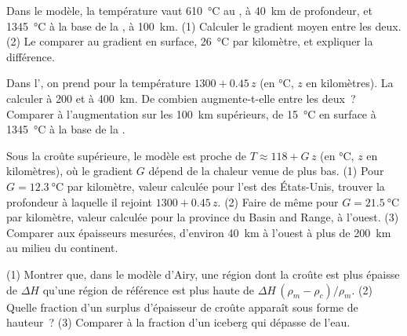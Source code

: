 \begin{exercise}[$\star\star$]\label{exo:g11:lithosphere-asthenosphere:10}
Dans le  modèle, la température vaut \qty{610}{\celsius} au , à
\qty{40}{km} de profondeur, et \qty{1345}{\celsius} à la base de la
, à \qty{100}{km}. (1) Calculer le gradient moyen entre les
deux. (2) Le comparer au gradient en surface, \qty{26}{\celsius} par
kilomètre, et expliquer la différence.
\end{exercise}

\begin{exercise}[$\star\star$]\label{exo:g11:lithosphere-asthenosphere:11}
Dans l', on prend pour la température $1300 + 0.45\,z$ (en
\unit{\celsius}, $z$ en kilomètres). La calculer à 200 et à \qty{400}{km}.
De combien augmente-t-elle entre les deux~? Comparer à l'augmentation sur les
\qty{100}{km} supérieurs, de \qty{15}{\celsius} en surface à
\qty{1345}{\celsius} à la base de la .
\end{exercise}

\begin{exercise}[$\star\star\star$]\label{exo:g11:lithosphere-asthenosphere:12}
Sous la croûte supérieure, le  modèle est proche de $T \approx 118 +
G\,z$ (en \unit{\celsius}, $z$ en kilomètres), où le gradient $G$
dépend de la chaleur venue de plus bas. (1) Pour $G =
\qty{12.3}{\celsius}$ par kilomètre, valeur calculée pour l'est des
États-Unis, trouver la profondeur à laquelle il rejoint $1300 + 0.45\,z$.
(2) Faire de même pour $G = \qty{21.5}{\celsius}$ par kilomètre, valeur
calculée pour la province du Basin and Range, à l'ouest. (3) Comparer aux
épaisseurs mesurées, d'environ \qty{40}{km} à l'ouest à plus de
\qty{200}{km} au milieu du continent.
\end{exercise}

\begin{exercise}[$\star\star\star$]\label{exo:g11:lithosphere-asthenosphere:13}
(1) Montrer que, dans le modèle d'Airy, une région dont la croûte est plus
épaisse de $\Delta H$ qu'une région de référence est plus haute de
$\Delta H\,(\rho_m - \rho_c)/\rho_m$. (2) Quelle fraction d'un surplus
d'épaisseur de croûte apparaît sous forme de hauteur~? (3) Comparer à la
fraction d'un iceberg qui dépasse de l'eau.
\end{exercise}

